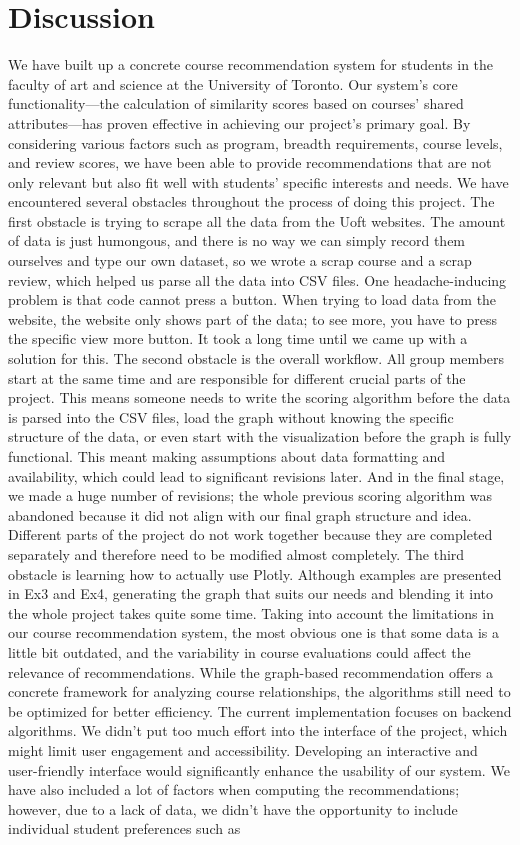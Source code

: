 \documentclass[fontsize=11pt]{article}
\begin{document}
\section*{Discussion}
We have built up a concrete course recommendation system for students in the faculty of art and science at the University of Toronto. Our system's core functionality—the calculation of similarity scores based on courses' shared attributes—has proven effective in achieving our project's primary goal. By considering various factors such as program, breadth requirements, course levels, and review scores, we have been able to provide recommendations that are not only relevant but also fit well with students' specific interests and needs. We have encountered several obstacles throughout the process of doing this project. The first obstacle is trying to scrape all the data from the Uoft websites. The amount of data is just humongous, and there is no way we can simply record them ourselves and type our own dataset, so we wrote a scrap course and a scrap review, which helped us parse all the data into CSV files. One headache-inducing problem is that code cannot press a button. When trying to load data from the website, the website only shows part of the data; to see more, you have to press the specific view more button. It took a long time until we came up with a solution for this. The second obstacle is the overall workflow. All group members start at the same time and are responsible for different crucial parts of the project. This means someone needs to write the scoring algorithm before the data is parsed into the CSV files, load the graph without knowing the specific structure of the data, or even start with the visualization before the graph is fully functional. This meant making assumptions about data formatting and availability, which could lead to significant revisions later. And in the final stage, we made a huge number of revisions; the whole previous scoring algorithm was abandoned because it did not align with our final graph structure and idea. Different parts of the project do not work together because they are completed separately and therefore need to be modified almost completely. The third obstacle is learning how to actually use Plotly. Although examples are presented in Ex3 and Ex4, generating the graph that suits our needs and blending it into the whole project takes quite some time. Taking into account the limitations in our course recommendation system, the most obvious one is that some data is a little bit outdated, and the variability in course evaluations could affect the relevance of recommendations. While the graph-based recommendation offers a concrete framework for analyzing course relationships, the algorithms still need to be optimized for better efficiency. The current implementation focuses on backend algorithms. We didn't put too much effort into the interface of the project, which might limit user engagement and accessibility. Developing an interactive and user-friendly interface would significantly enhance the usability of our system. We have also included a lot of factors when computing the recommendations; however, due to a lack of data, we didn't have the opportunity to include individual student preferences such as 
\end{document}
